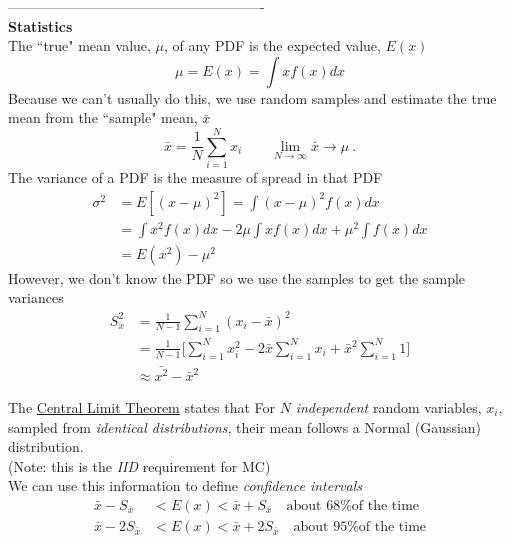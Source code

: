 \documentclass[12pt]{article}
\begin{document}
\clearpage
-------------------------------------------------------\\
\textbf{Statistics}\\
The ``true" mean value, $\mu$, of any PDF is the expected value, $E(x)$
\[
\mu = E(x) = \int x f(x) dx
\]
Because we can't usually do this, we use random samples and estimate the true mean from the ``sample" mean, $\bar{x}$
\[
\bar{x} = \frac{1}{N}\sum_{i=1}^N x_i \qquad \lim_{N \to \infty} \bar{x} \rightarrow \mu\:.
\]
The variance of a PDF is the measure of spread in that PDF
\begin{align*}
\sigma^2 &= E[(x - \mu)^2] = \int (x - \mu)^2 f(x) dx \\
&= \int x^2 f(x) dx - 2 \mu \int x f(x) dx + \mu^2 \int f(x) dx\\
&= E(x^2) - \mu^2
\end{align*}
%
However, we don't know the PDF so we use the samples to get the sample variances
\begin{align*}
S_x^2 &= \frac{1}{N-1}\sum_{i=1}^N (x_i - \bar{x})^2 \\
&= \frac{1}{N-1} \biggl[\sum_{i=1}^N x_i^2 - 2 \bar{x}\sum_{i=1}^N x_i + \bar{x}^2 \sum_{i=1}^N 1 \biggr] \\
&\approx \bar{x^2} - \bar{x}^2
\end{align*}

The \underline{Central Limit Theorem} states that
For $N$ \textit{independent} random variables, $x_i$, sampled from \textit{identical distributions}, their mean follows a Normal (Gaussian) distribution.\\
(Note: this is the \textit{IID} requirement for MC)\\
We can use this information to define \textit{confidence intervals}
\begin{align*}
\bar{x} - S_{\bar{x}} &< E(x) < \bar{x} + S_{\bar{x}} \quad \text{about 68\% of the time}\\
\bar{x} - 2S_{\bar{x}} &< E(x) < \bar{x} + 2S_{\bar{x}} \quad \text{about 95\% of the time}
\end{align*}
\end{document}

